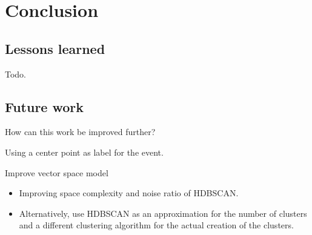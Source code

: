 \section{Conclusion}

\subsection{Lessons learned}
Todo.

\subsection{Future work}

How can this work be improved further?

Using a center point as label for the event.

Improve vector space model

\begin{itemize}
    \item Improving space complexity and noise ratio of HDBSCAN.
    \item Alternatively, use HDBSCAN as an approximation for the number of clusters and a different clustering algorithm
    for the actual creation of the clusters.
\end{itemize}
